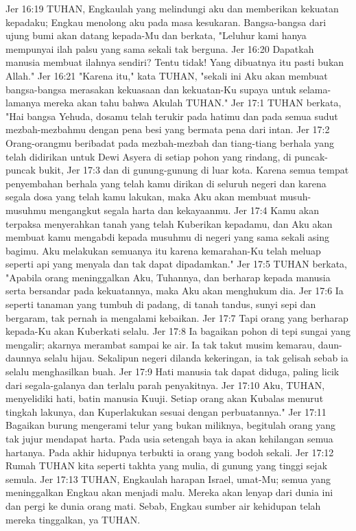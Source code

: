 Jer 16:19  TUHAN, Engkaulah yang melindungi aku dan memberikan kekuatan kepadaku; Engkau menolong aku pada masa kesukaran. Bangsa-bangsa dari ujung bumi akan datang kepada-Mu dan berkata, "Leluhur kami hanya mempunyai ilah palsu yang sama sekali tak berguna.
Jer 16:20  Dapatkah manusia membuat ilahnya sendiri? Tentu tidak! Yang dibuatnya itu pasti bukan Allah."
Jer 16:21  "Karena itu," kata TUHAN, "sekali ini Aku akan membuat bangsa-bangsa merasakan kekuasaan dan kekuatan-Ku supaya untuk selama-lamanya mereka akan tahu bahwa Akulah TUHAN."
Jer 17:1  TUHAN berkata, "Hai bangsa Yehuda, dosamu telah terukir pada hatimu dan pada semua sudut mezbah-mezbahmu dengan pena besi yang bermata pena dari intan.
Jer 17:2  Orang-orangmu beribadat pada mezbah-mezbah dan tiang-tiang berhala yang telah didirikan untuk Dewi Asyera di setiap pohon yang rindang, di puncak-puncak bukit,
Jer 17:3  dan di gunung-gunung di luar kota. Karena semua tempat penyembahan berhala yang telah kamu dirikan di seluruh negeri dan karena segala dosa yang telah kamu lakukan, maka Aku akan membuat musuh-musuhmu mengangkut segala harta dan kekayaanmu.
Jer 17:4  Kamu akan terpaksa menyerahkan tanah yang telah Kuberikan kepadamu, dan Aku akan membuat kamu mengabdi kepada musuhmu di negeri yang sama sekali asing bagimu. Aku melakukan semuanya itu karena kemarahan-Ku telah meluap seperti api yang menyala dan tak dapat dipadamkan."
Jer 17:5  TUHAN berkata, "Apabila orang meninggalkan Aku, Tuhannya, dan berharap kepada manusia serta bersandar pada kekuatannya, maka Aku akan menghukum dia.
Jer 17:6  Ia seperti tanaman yang tumbuh di padang, di tanah tandus, sunyi sepi dan bergaram, tak pernah ia mengalami kebaikan.
Jer 17:7  Tapi orang yang berharap kepada-Ku akan Kuberkati selalu.
Jer 17:8  Ia bagaikan pohon di tepi sungai yang mengalir; akarnya merambat sampai ke air. Ia tak takut musim kemarau, daun-daunnya selalu hijau. Sekalipun negeri dilanda kekeringan, ia tak gelisah sebab ia selalu menghasilkan buah.
Jer 17:9  Hati manusia tak dapat diduga, paling licik dari segala-galanya dan terlalu parah penyakitnya.
Jer 17:10  Aku, TUHAN, menyelidiki hati, batin manusia Kuuji. Setiap orang akan Kubalas menurut tingkah lakunya, dan Kuperlakukan sesuai dengan perbuatannya."
Jer 17:11  Bagaikan burung mengerami telur yang bukan miliknya, begitulah orang yang tak jujur mendapat harta. Pada usia setengah baya ia akan kehilangan semua hartanya. Pada akhir hidupnya terbukti ia orang yang bodoh sekali.
Jer 17:12  Rumah TUHAN kita seperti takhta yang mulia, di gunung yang tinggi sejak semula.
Jer 17:13  TUHAN, Engkaulah harapan Israel, umat-Mu; semua yang meninggalkan Engkau akan menjadi malu. Mereka akan lenyap dari dunia ini dan pergi ke dunia orang mati. Sebab, Engkau sumber air kehidupan telah mereka tinggalkan, ya TUHAN.
